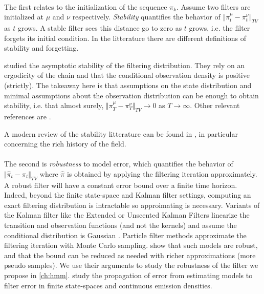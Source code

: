 \paragraph{} The first relates to the initialization of the sequence $\pi_k$. Assume two filters are initialized at $\mu$ and $\nu$ respectively. \emph{Stability} quantifies the behavior of $\Vert \pi_t^\mu - \pi_t^\nu \Vert_{TV}$ as $t$ grows. A stable filter sees this distance go to zero as $t$ grows, i.e. the filter forgets its initial condition. In the litterature there are different definitions of stability and forgetting.

\cite{ocone} studied the asymptotic stability of the filtering distribution. They rely on an ergodicity of the chain and that the conditional observation density is positive (strictly). The takeaway here is that assumptions on the state distribution and minimal assumptions about the observation distribution can be enough to obtain stability, i.e. that almost surely, $\Vert \pi_T^\mu - \pi^\nu_T\Vert_{TV} \to 0$ as $T\to\infty$. Other relevant references are \citet{atar1,chigansky,legland99,mcdonald2020}.

A modern review of the stability litterature can be found in \cite{kim2022duality}, in particular concerning the rich history of the field.

\paragraph{} The second is \emph{robustness} to model error, which quantifies the behavior of $\Vert \hat\pi_t - \pi_t\Vert_{TV}$ where $\hat \pi$ is obtained by applying the filtering iteration approximately. A robust filter will have a constant error bound over a finite time horizon. Indeed, beyond the finite state-space and Kalman filter settings, computing an exact filtering distribution is intractable so approimating is necessary. Variants of the Kalman filter like the Extended or Unscented Kalman Filters \citep{ukf,sarkka} linearize the transition and observation functions (and not the kernels) and assume the conditional distribution is Gaussian \citep{sarkka}. Particle filter methods approximate the filtering iteration with Monte Carlo sampling\citep{gordon-pf}. \citet{oudjane} show that such models are robust, and that the bound can be reduced as needed with richer approximations (more pseudo samples).
We use their arguments to study the robustness of the filter we propose in \cref{ch:hmm}.
\cite{decastro2017,mitrophanov-hmm-stability-2005} study the propagation of error from estimating models to filter error in finite state-spaces and continuous emission densities.



